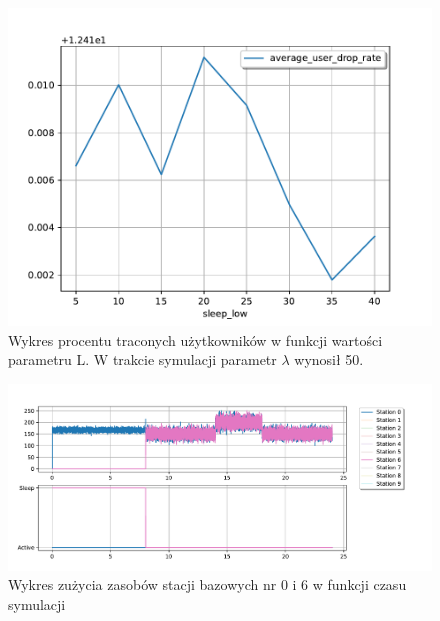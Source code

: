 \begin{figure}[h!]
\center
\includegraphics[scale=0.65]{img/drop_rate_lambda_50.pdf} 
\caption{Wykres procentu traconych użytkowników w funkcji wartości parametru L. W trakcie symulacji parametr $\lambda$ wynosił 50.}
\label{dropped_users_iter_l3}
\end{figure}
\begin{figure}[h!]
\center
\includegraphics[scale=0.65]{img/usage_over_time.pdf} 
\caption{Wykres zużycia zasobów stacji bazowych nr 0 i 6 w funkcji czasu symulacji}
\label{usage_over_time}
\end{figure}

\newpage
